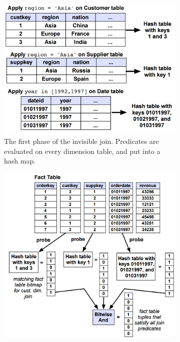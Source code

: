 \begin{figure}
  \centering
  \begin{subfigure}{0.45\textwidth}
    \includegraphics[width=\textwidth]{img/invisible-join-1.png}
    \caption{The first phase of the invisible join. Predicates are evaluated on every dimension table, and put into a hash map.}
    \label{fig:invisible-join-1} 
  \end{subfigure}
  \begin{subfigure}{0.45\textwidth}
    \includegraphics[width=\textwidth]{img/invisible-join-2.png}

\end{subfigure}
\end{figure}
